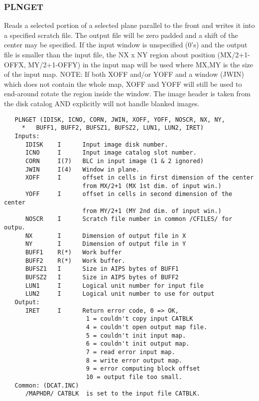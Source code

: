 \subsubsection{PLNGET}
Reads a selected portion of a selected plane parallel to the
front and writes it into a specified scratch file.  The output file
will be zero padded and a shift of the center may be specified.  If
the input window is unspecified (0's) and the output file is smaller
than the input file, the NX x NY region about position (MX/2+1-OFFX,
MY/2+1-OFFY) in the input map will be used where MX,MY is the size
of the input map.  NOTE: If both XOFF and/or YOFF and a window
(JWIN) which does not contain the whole map, XOFF and YOFF will
still be used to end-around rotate the region inside the window.
The image header is taken from the disk catalog AND explicitly will
not handle blanked images.
\begin{verbatim}
   PLNGET (IDISK, ICNO, CORN, JWIN, XOFF, YOFF, NOSCR, NX, NY,
     *   BUFF1, BUFF2, BUFSZ1, BUFSZ2, LUN1, LUN2, IRET)
   Inputs:
      IDISK    I      Input image disk number.
      ICNO     I      Input image catalog slot number.
      CORN     I(7)   BLC in input image (1 & 2 ignored)
      JWIN     I(4)   Window in plane.
      XOFF     I      offset in cells in first dimension of the center
                      from MX/2+1 (MX 1st dim. of input win.)
      YOFF     I      offset in cells in second dimension of the center
                      from MY/2+1 (MY 2nd dim. of input win.)
      NOSCR    I      Scratch file number in common /CFILES/ for outpu.
      NX       I      Dimension of output file in X
      NY       I      Dimension of output file in Y
      BUFF1    R(*)   Work buffer
      BUFF2    R(*)   Work buffer.
      BUFSZ1   I      Size in AIPS bytes of BUFF1
      BUFSZ2   I      Size in AIPS bytes of BUFF2
      LUN1     I      Logical unit number for input file
      LUN2     I      Logical unit number to use for output
   Output:
      IRET     I      Return error code, 0 => OK,
                       1 = couldn't copy input CATBLK
                       4 = couldn't open output map file.
                       5 = couldn't init input map.
                       6 = couldn't init output map.
                       7 = read error input map.
                       8 = write error output map.
                       9 = error computing block offset
                       10 = output file too small.
   Common: (DCAT.INC)
      /MAPHDR/ CATBLK  is set to the input file CATBLK.

\end{verbatim}


